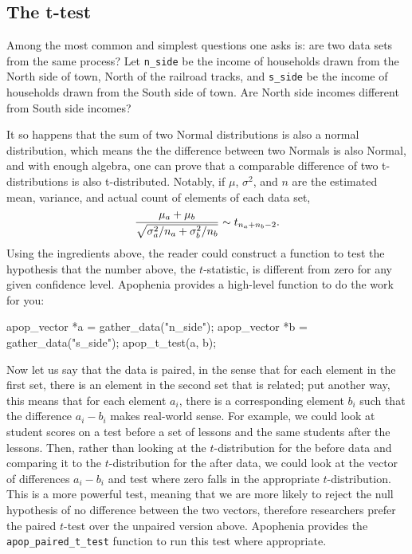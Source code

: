 
\subsection{The t-test} \label{ttest}
Among the most common and simplest questions one asks is: are two data
sets from the same process? Let {\tt n\_side} be the income of households
drawn from the North side of town, North of the railroad tracks, and
{\tt s\_side} be the income of households drawn from the South side of
town. Are North side incomes different from South side incomes? 

It so happens that the sum of two Normal distributions is also a normal
distribution, which means the the difference between two Normals is also
Normal, and with enough algebra, one can prove that a comparable difference of 
two t-distributions is also t-distributed. Notably, if $\mu$,
$\sigma^2$, and $n$ are the estimated mean, variance, and actual count
of elements of each data set,
$${\mu_a + \mu_b \over \sqrt{\sigma^2_a/n_a + \sigma^2_b/n_b}} \sim t_{n_a + n_b -2}.$$
Using the ingredients above, the reader could construct a function to
test the hypothesis that the number above, the $t$-statistic, is
different from zero for any given confidence level. Apophenia provides a
high-level function to do the work for you:

apop_vector *a = gather_data("n_side");
apop_vector *b = gather_data("s_side");
apop_t_test(a, b);

Now let us say that the data is paired, in the sense that for each
element in the first set, there is an element in the second set that is
related; put another way, this means that for each element $a_i$, there
is a corresponding element $b_i$ such that the difference $a_i - b_i$
makes real-world sense. For example, we could look at student scores on
a test before a set of lessons and the same students after the lessons.
Then, rather than looking at the $t$-distribution for the before data
and comparing it to the $t$-distribution for the after data, we could
look at the vector of differences $a_i - b_i$ and test where zero falls
in the appropriate $t$-distribution. This is a more powerful test,
meaning that we are more likely to reject the null hypothesis of no
difference between the two vectors, therefore researchers prefer the
paired $t$-test over the unpaired version above. Apophenia provides the
{\tt apop\_paired\_t\_test} function to run this test where appropriate.

